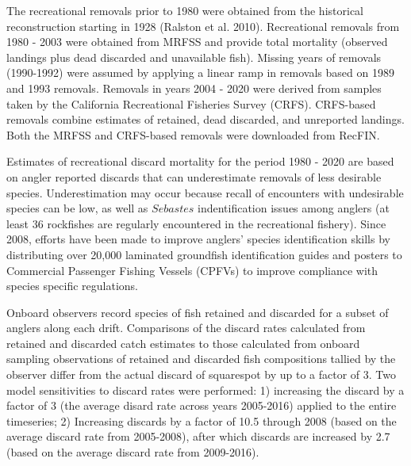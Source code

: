 \documentclass[11pt,
  english,
  a4paper,
]{article}
\begin{document}
\leavevmode\tagmcend\tagstructend


The recreational removals prior to 1980 were obtained from the historical reconstruction starting in 1928 {(Ralston et al. 2010)\leavevmode\tagmcend\tagstructend}. Recreational removals from 1980 - 2003 were obtained from MRFSS and provide total mortality (observed landings plus dead discarded and unavailable fish). Missing years of removals (1990-1992) were assumed by applying a linear ramp in removals based on 1989 and 1993 removals. Removals in years 2004 - 2020 were derived from samples taken by the California Recreational Fisheries Survey (CRFS). CRFS-based removals combine estimates of retained, dead discarded, and unreported landings. Both the MRFSS and CRFS-based removals were downloaded from RecFIN.

\leavevmode\tagmcend\tagstructend\par


Estimates of recreational discard mortality for the period 1980 - 2020 are based on angler reported discards that can underestimate removals of less desirable species. Underestimation may occur because recall of encounters with undesirable species can be low, as well as {\(Sebastes\)\leavevmode\tagmcend\tagstructend} indentification issues among anglers (at least 36 rockfishes are regularly encountered in the recreational fishery). Since 2008, efforts have been made to improve anglers' species identification skills by distributing over 20,000 laminated groundfish identification guides and posters to Commercial Passenger Fishing Vessels (CPFVs) to improve compliance with species specific regulations.

\leavevmode\tagmcend\tagstructend\par


Onboard observers record species of fish retained and discarded for a subset of anglers along each drift. Comparisons of the discard rates calculated from retained and discarded catch estimates to those calculated from onboard sampling observations of retained and discarded fish compositions tallied by the observer differ from the actual discard of squarespot by up to a factor of 3. Two model sensitivities to discard rates were performed: 1) increasing the discard by a factor of 3 (the average disard rate across years 2005-2016) applied to the entire timeseries; 2) Increasing discards by a factor of 10.5 through 2008 (based on the average discard rate from 2005-2008), after which discards are increased by 2.7 (based on the average discard rate from 2009-2016).
\end{document}
